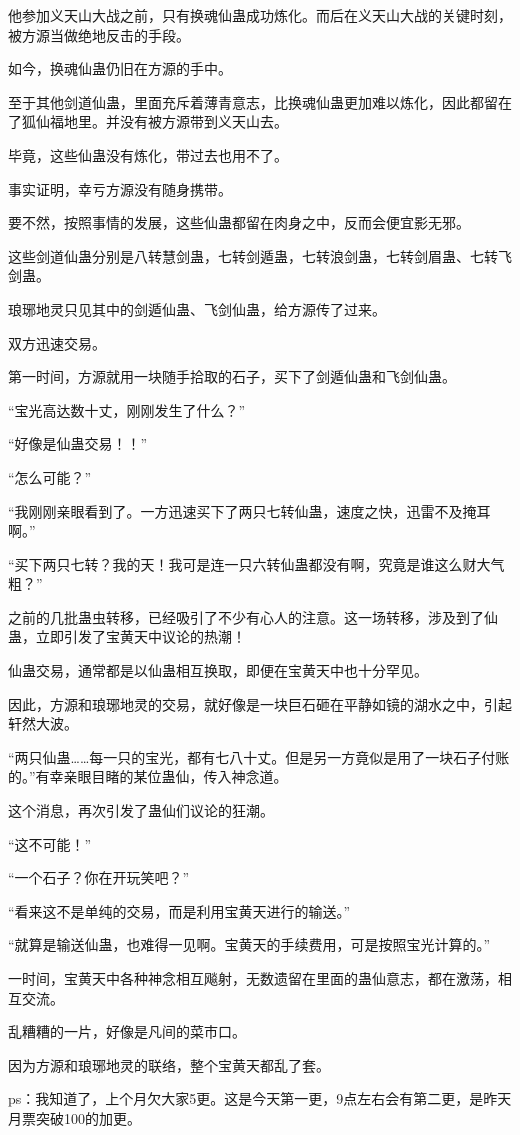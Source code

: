 \begin{this_body}
他参加义天山大战之前，只有换魂仙蛊成功炼化。而后在义天山大战的关键时刻，被方源当做绝地反击的手段。

如今，换魂仙蛊仍旧在方源的手中。

至于其他剑道仙蛊，里面充斥着薄青意志，比换魂仙蛊更加难以炼化，因此都留在了狐仙福地里。并没有被方源带到义天山去。

毕竟，这些仙蛊没有炼化，带过去也用不了。

事实证明，幸亏方源没有随身携带。

要不然，按照事情的发展，这些仙蛊都留在肉身之中，反而会便宜影无邪。

这些剑道仙蛊分别是八转慧剑蛊，七转剑遁蛊，七转浪剑蛊，七转剑眉蛊、七转飞剑蛊。

琅琊地灵只见其中的剑遁仙蛊、飞剑仙蛊，给方源传了过来。

双方迅速交易。

第一时间，方源就用一块随手拾取的石子，买下了剑遁仙蛊和飞剑仙蛊。

“宝光高达数十丈，刚刚发生了什么？”

“好像是仙蛊交易！！”

“怎么可能？”

“我刚刚亲眼看到了。一方迅速买下了两只七转仙蛊，速度之快，迅雷不及掩耳啊。”

“买下两只七转？我的天！我可是连一只六转仙蛊都没有啊，究竟是谁这么财大气粗？”

之前的几批蛊虫转移，已经吸引了不少有心人的注意。这一场转移，涉及到了仙蛊，立即引发了宝黄天中议论的热潮！

仙蛊交易，通常都是以仙蛊相互换取，即便在宝黄天中也十分罕见。

因此，方源和琅琊地灵的交易，就好像是一块巨石砸在平静如镜的湖水之中，引起轩然大波。

“两只仙蛊……每一只的宝光，都有七八十丈。但是另一方竟似是用了一块石子付账的。”有幸亲眼目睹的某位蛊仙，传入神念道。

这个消息，再次引发了蛊仙们议论的狂潮。

“这不可能！”

“一个石子？你在开玩笑吧？”

“看来这不是单纯的交易，而是利用宝黄天进行的输送。”

“就算是输送仙蛊，也难得一见啊。宝黄天的手续费用，可是按照宝光计算的。”

一时间，宝黄天中各种神念相互飚射，无数遗留在里面的蛊仙意志，都在激荡，相互交流。

乱糟糟的一片，好像是凡间的菜市口。

因为方源和琅琊地灵的联络，整个宝黄天都乱了套。

ps：我知道了，上个月欠大家5更。这是今天第一更，9点左右会有第二更，是昨天月票突破100的加更。

\end{this_body}

